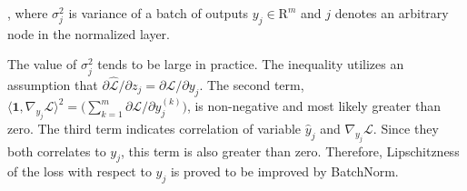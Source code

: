\documentclass{article}
\begin{document}
, where $\sigma_j^2$ is variance of a batch of outputs $y_j\in\mathrm{R}^m$ and $j$ denotes an arbitrary node in the normalized layer. 

The value of $\sigma_j^2$ tends to be large in practice. The inequality utilizes an assumption that $\partial \hat{\mathcal{L}}/\partial z_j = \partial \mathcal{L}/\partial y_j$. The second term, $ \langle \mathbf{1},\nabla_{y_j}\mathcal{L} \rangle^2=\big( \sum_{k=1}^{m}\partial \mathcal{L}/\partial y_j^{(k)} \big)$, is non-negative and most likely greater than zero. The third term indicates correlation of variable $\hat{y}_j$ and $\nabla_{y_j}\mathcal{L}$. Since they both correlates to $y_j$, this term is also greater than zero. Therefore,  Lipschitzness of the loss with respect to $y_j$ is proved to be improved by BatchNorm.

\end{document}
